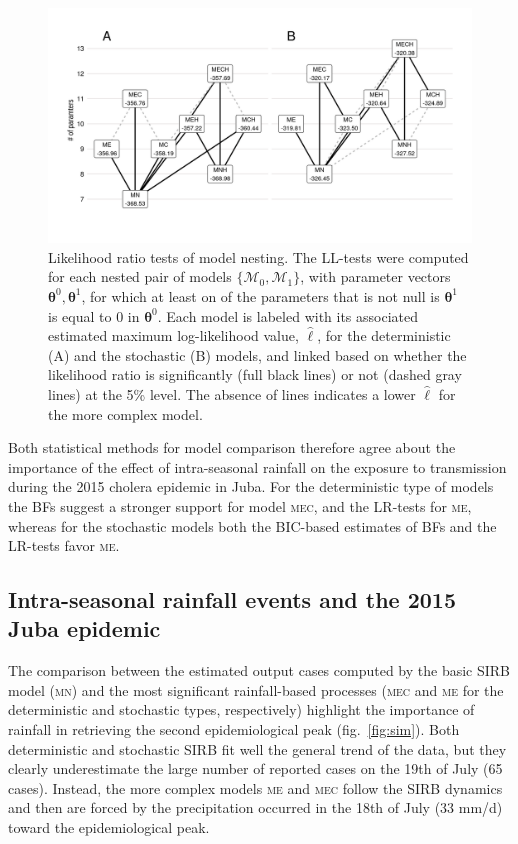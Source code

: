 \begin{figure}
    \centering
    \includegraphics[width = \textwidth, trim = 11mm 19mm 10mm 12mm, clip]{fig_cholera-rainfall/Lemaitre_ACTROP_2018_42_R1_fig3.png}
    \caption[Likelihood ratio tests of model nesting]{Likelihood ratio tests of model nesting. The LL-tests were computed for each nested pair of models $\{\mathcal{M}_0, \mathcal{M}_1\}$, with parameter vectors $\boldsymbol{\theta}^0,\boldsymbol{\theta}^1$, for which at least on of the parameters that is not null is $\boldsymbol{\theta}^1$ is equal to $0$ in $\boldsymbol{\theta}^0$. Each model is labeled with its associated estimated maximum log-likelihood value, $\hat{\ell}$, for the deterministic (A) and the stochastic (B) models, and linked based on whether the likelihood ratio is significantly (full black lines) or not (dashed gray lines) at the 5\% level. The absence of lines indicates a lower $\hat{\ell}$ for the more complex model.} 
    \label{fig:lltests}
\end{figure}


Both statistical methods for model comparison therefore agree about the importance of the effect of intra-seasonal rainfall on the exposure to transmission during the 2015 cholera epidemic in Juba. For the deterministic type of models the BFs suggest a stronger support for model \textsc{mec}, and the LR-tests for \textsc{me}, whereas for the stochastic models both the BIC-based estimates of BFs and the LR-tests favor \textsc{me}. 

\subsection{Intra-seasonal rainfall events and the 2015 Juba epidemic}

The comparison between the estimated output cases computed by the basic SIRB model (\textsc{mn}) and the most significant rainfall-based processes (\textsc{mec} and \textsc{me} for the deterministic and stochastic types, respectively) highlight the importance of rainfall in retrieving the second epidemiological peak (fig.~\ref{fig:sim}). Both deterministic and stochastic SIRB fit well the general trend of the data, but they clearly underestimate the large number of reported cases on the 19th of July (65 cases). Instead, the more complex models \textsc{me} and \textsc{mec} follow the SIRB dynamics and then are forced by the precipitation occurred in the 18th of July (33 mm/d)  toward the epidemiological peak. 
%

